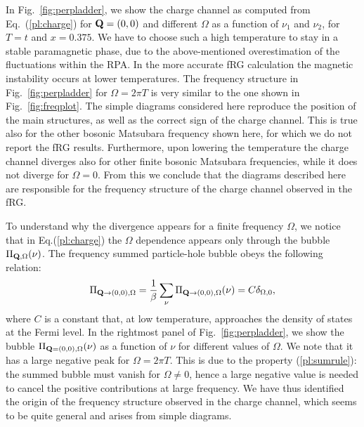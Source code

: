 In Fig.~\ref{fig:perpladder}, we show the charge channel as computed from Eq.~(\ref{pl:charge}) for $\mathbf{Q}=(0,0)$  and different $\Omega$ as a function of $\nu_1$ and $\nu_2$, for $T=t$ and $x=0.375$.
We have to choose such a high temperature to stay in a stable paramagnetic phase, due to the above-mentioned overestimation of the fluctuations within the RPA. In the more accurate fRG calculation the magnetic instability occurs at lower temperatures.
The frequency structure in Fig.~\ref{fig:perpladder} for $\Omega=2\pi T$ is very similar to the one shown in Fig.~\ref{fig:freqplot}. 
The simple diagrams considered here reproduce the position of the main structures, as well as the correct sign of the charge channel. 
This is true also for the other bosonic Matsubara frequency shown here, for which we do not report the fRG results. 
Furthermore, upon lowering the temperature the charge channel diverges also for other finite bosonic Matsubara frequencies, while it does not diverge for $\Omega=0$.
From this we conclude that the diagrams described here are responsible for the frequency structure of the charge channel observed in the fRG. 

To understand why the divergence appears for a finite frequency $\Omega$, we notice that in Eq.(\ref{pl:charge}) the $\Omega$ dependence 
appears only through the bubble $\Pi_{\mathbf{Q},\Omega}(\nu)$. The frequency summed particle-hole bubble obeys the following relation:  
\begin{equation}
 \Pi_{\mathbf{Q}\rightarrow(0,0),\Omega} = \frac{1}{\beta} \sum_{\nu}
 \Pi_{\mathbf{Q}\rightarrow(0,0),\Omega}(\nu) = C \delta_{\Omega,0},
\label{pl:sumrule}
\end{equation}
where $C$ is a constant that, at low temperature, approaches the density of states at the Fermi level.
In the rightmost panel of Fig.~\ref{fig:perpladder}, we show the bubble $\Pi_{\mathbf{Q}=(0,0),\Omega}(\nu)$ as a function of $\nu$ for different values of $\Omega$.
We note that it has a large negative peak for $\Omega=2\pi T$.
This is due to the property (\ref{pl:sumrule}): the summed 
bubble must vanish for $\Omega \neq 0$, hence a large negative value is needed to cancel the positive contributions at large frequency. 
We have thus identified the origin of the frequency structure observed in the charge channel, which seems to be quite general and arises from simple diagrams. 

